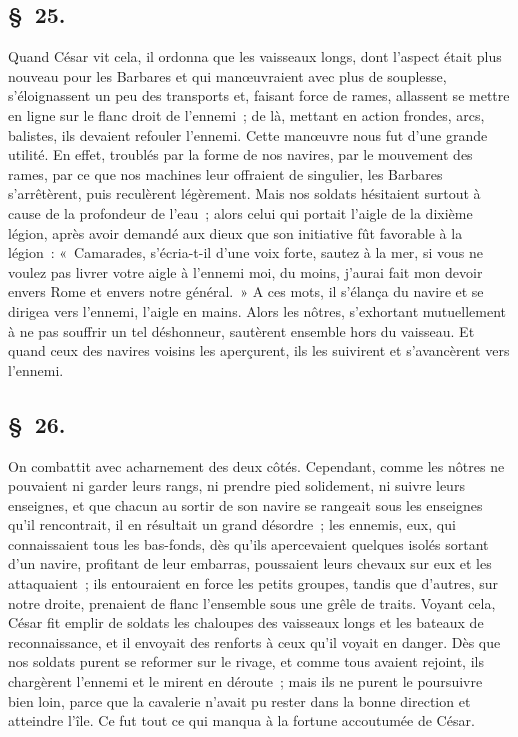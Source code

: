 \documentclass[french,twoside]{book} %
\begin{document}
\subsection[{§ 25.}]{ \textsc{§ 25.} }
\noindent Quand César vit cela, il ordonna que les vaisseaux longs, dont l’aspect était plus nouveau pour les Barbares et qui manœuvraient avec plus de souplesse, s’éloignassent un peu des transports et, faisant force de rames, allassent se mettre en ligne sur le flanc droit de l’ennemi ; de là, mettant en action frondes, arcs, balistes, ils devaient refouler l’ennemi. Cette manœuvre nous fut d’une grande utilité. En effet, troublés par la forme de nos navires, par le mouvement des rames, par ce que nos machines leur offraient de singulier, les Barbares s’arrêtèrent, puis reculèrent légèrement. Mais nos soldats hésitaient surtout à cause de la profondeur de l’eau ; alors celui qui portait l’aigle de la dixième légion, après avoir demandé aux dieux que son initiative fût favorable à la légion : « Camarades, s’écria-t-il d’une voix forte, sautez à la mer, si vous ne voulez pas livrer votre aigle à l’ennemi moi, du moins, j’aurai fait mon devoir envers Rome et envers notre général. » A ces mots, il s’élança du navire et se dirigea vers l’ennemi, l’aigle en mains. Alors les nôtres, s’exhortant mutuellement à ne pas souffrir un tel déshonneur, sautèrent ensemble hors du vaisseau. Et quand ceux des navires voisins les aperçurent, ils les suivirent et s’avancèrent vers l’ennemi.
\subsection[{§ 26.}]{ \textsc{§ 26.} }
\noindent On combattit avec acharnement des deux côtés. Cependant, comme les nôtres ne pouvaient ni garder leurs rangs, ni prendre pied solidement, ni suivre leurs enseignes, et que chacun au sortir de son navire se rangeait sous les enseignes qu’il rencontrait, il en résultait un grand désordre ; les ennemis, eux, qui connaissaient tous les bas-fonds, dès qu’ils apercevaient quelques isolés sortant d’un navire, profitant de leur embarras, poussaient leurs chevaux sur eux et les attaquaient ; ils entouraient en force les petits groupes, tandis que d’autres, sur notre droite, prenaient de flanc l’ensemble sous une grêle de traits. Voyant cela, César fit emplir de soldats les chaloupes des vaisseaux longs et les bateaux de reconnaissance, et il envoyait des renforts à ceux qu’il voyait en danger. Dès que nos soldats purent se reformer sur le rivage, et comme tous avaient rejoint, ils chargèrent l’ennemi et le mirent en déroute ; mais ils ne purent le poursuivre bien loin, parce que la cavalerie n’avait pu rester dans la bonne direction et atteindre l’île. Ce fut tout ce qui manqua à la fortune accoutumée de César.
\end{document}
